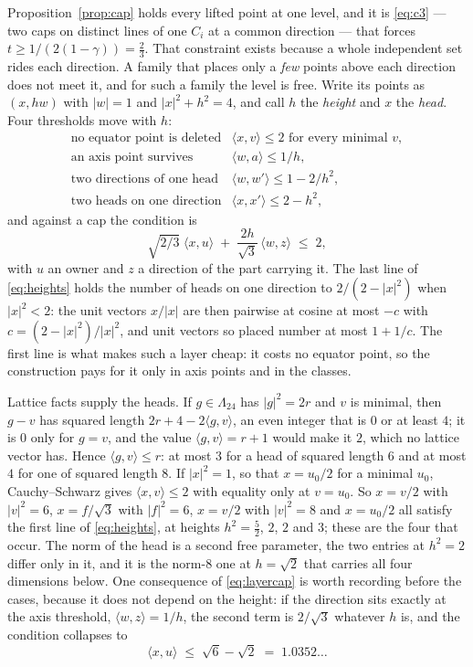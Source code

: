 \documentclass[11pt]{amsart}
\theoremstyle{remark}
\newcommand{\Leech}{\Lambda_{24}}
\newcommand{\ip}[2]{\langle #1,#2\rangle}
\begin{document}
Proposition~\ref{prop:cap} holds every lifted point at one level, and it is
\eqref{eq:c3} --- two caps on distinct lines of one $C_i$ at a common direction
--- that forces $t\ge1/(2(1-\gamma))=\tfrac23$. That constraint exists because a
whole independent set rides each direction. A family that places only a
\emph{few} points above each direction does not meet it, and for such a family
the level is free. Write its points as $(x,hw)$ with $|w|=1$ and
$|x|^{2}+h^{2}=4$, and call $h$ the \emph{height} and $x$ the \emph{head}. Four
thresholds move with $h$:
\begin{equation}\label{eq:heights}
\begin{array}{ll}
  \text{no equator point is deleted} & \ip{x}{v}\le2 \text{ for every minimal } v,\\[2pt]
  \text{an axis point survives}      & \ip{w}{a}\le1/h,\\[2pt]
  \text{two directions of one head}  & \ip{w}{w'}\le1-2/h^{2},\\[2pt]
  \text{two heads on one direction}  & \ip{x}{x'}\le2-h^{2},
\end{array}
\end{equation}
and against a cap the condition is
\begin{equation}\label{eq:layercap}
  \sqrt{2/3}\;\ip{x}{u}\;+\;\frac{2h}{\sqrt3}\,\ip{w}{z}\;\le\;2 ,
\end{equation}
with $u$ an owner and $z$ a direction of the part carrying it. The last line of
\eqref{eq:heights} holds the number of heads on one direction to
$2/(2-|x|^{2})$ when $|x|^{2}<2$: the unit vectors $x/|x|$ are then pairwise at
cosine at most $-c$ with $c=(2-|x|^{2})/|x|^{2}$, and unit vectors so placed
number at most $1+1/c$. The first line is what makes such a layer cheap: it
costs no equator point, so the construction pays for it only in axis points and
in the classes.

Lattice facts supply the heads. If $g\in\Leech$ has $|g|^{2}=2r$ and $v$ is
minimal, then $g-v$ has squared length $2r+4-2\ip{g}{v}$, an even integer that
is $0$ or at least $4$; it is $0$ only for $g=v$, and the value
$\ip{g}{v}=r+1$ would make it $2$, which no lattice vector has. Hence
$\ip{g}{v}\le r$: at most $3$ for a head of squared length $6$ and at most $4$
for one of squared length $8$. If $|x|^{2}=1$, so that $x=u_{0}/2$ for a minimal
$u_{0}$, Cauchy--Schwarz gives $\ip{x}{v}\le2$ with equality only at
$v=u_{0}$. So $x=v/2$ with $|v|^{2}=6$, $x=f/\sqrt3$ with $|f|^{2}=6$,
$x=v/2$ with $|v|^{2}=8$ and $x=u_{0}/2$ all satisfy the first line of
\eqref{eq:heights}, at heights $h^{2}=\tfrac52$, $2$, $2$ and $3$; these are the
four that occur. The norm of the head is a second free parameter, the two
entries at $h^{2}=2$ differ only in it, and it is the norm-$8$ one at $h=\sqrt2$
that carries all four dimensions below. One consequence of \eqref{eq:layercap} is worth
recording before the cases, because it does not depend on the height: if the
direction sits exactly at the axis threshold, $\ip{w}{z}=1/h$, the second term
is $2/\sqrt3$ whatever $h$ is, and the condition collapses to
\begin{equation}\label{eq:capthr}
  \ip{x}{u}\;\le\;\sqrt6-\sqrt2\;=\;1.0352\ldots
\end{equation}
\end{document}
